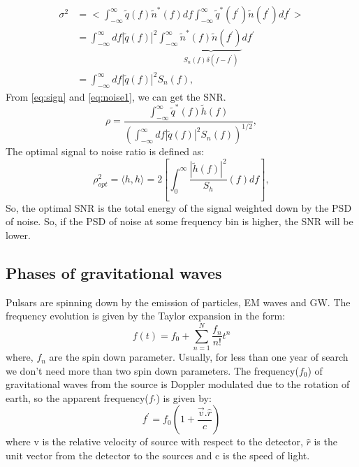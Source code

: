 \documentclass{ttuthes2007}
\begin{document}
\begin{equation}\label{eq:noise1}
\begin{split}
\sigma^{2} & =<\int_{-\infty}^{\infty}\tilde{q}(f)\tilde{n}^{*}(f)df
\int_{-\infty}^{\infty} \tilde{q}^{*}(f^{'}) \tilde{n}(f^{'})df^{'}>\\
       &= \int_{-\infty}^{\infty}df|\tilde{q}(f)|^{2}
\int_{-\infty}^{\infty}\underbrace{\tilde{n}^{*}(f)
\tilde{n}(f^{'})}_{S_{n}(f)\delta(f - f^{'})}df^{'}\\
      &=\int_{-\infty}^{\infty}df|\tilde{q}(f)|^{2} S_{n}(f),
\end{split}
\end{equation}
From \ref{eq:sign} and \ref{eq:noise1}, we can get the \ac{SNR}.
\begin{equation}
\rho=\frac{\int_{-\infty}^{\infty}\tilde{q}^{*}(f)\tilde{h}(f)}{(\int_{-\infty}^{\infty}df|\tilde{q}(f)|^2
S_{n}(f))^{1/2}},
\end{equation}
The optimal signal to noise ratio is defined as:
\begin{equation}
\rho_{opt}^2 = \langle h,h \rangle
=2\left[\int_{0}^{\infty}\frac{|\tilde{h}(f)|^2}{S_{h}}(f){}df\right],
\end{equation}
So, the optimal \ac{SNR} is the total energy of the signal weighted down by the
\ac{PSD} of noise. So, if the \ac{PSD} of noise at some frequency bin is higher,
the \ac{SNR} will be lower.


\subsection{Phases of gravitational waves}
Pulsars are spinning down by the emission of particles, \ac{EM} waves and \ac{GW}.
The frequency evolution is given by the Taylor expansion in the form:
\begin{equation}
f(t) = f_0 + \sum_{n=1}^{N} \frac{f_n}{n!}t^n
\end{equation}
where, $f_n$ are the spin down parameter. Usually, for less than one year of
search we don't need more than two spin down parameters. 
The frequency($f_0$) of gravitational waves from the source is Doppler modulated due to the
rotation of earth, so the apparent frequency($f_\prime$) is given by:
\begin{equation} 
f^\prime = f_0 \left(1+\frac{\vec{v}.\hat{r}}{c}\right)
\end{equation}
where v is the relative velocity of source with respect to the detector, $\hat{r}$
is the unit vector from the detector to the sources and c is the speed of light.
\end{document}

